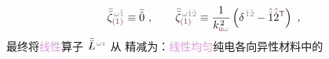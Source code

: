 \begin{align} \label{eq:zeta-restriction-L}
	\bar{\bar{\zeta}}^{\;\! \mathcolor{gray}{\omega} \mathcolor{gray}{\check{1}}}_{\textcolor{Maroon}{(1)}} \equiv \bar{\bar{0}} ~, ~~~~~~ \bar{\bar{\zeta}}^{\;\! \mathcolor{gray}{\omega} \mathcolor{gray}{\check{1} \check{2}}}_{\textcolor{Maroon}{(1)}} \equiv \frac{1}{k_{\textcolor{Maroon}{\mathsf{o}} \mathcolor{gray}{\omega}}^{\;\! 2}} \left( \delta^{\;\! \mathcolor{gray}{\check{1}} \mathcolor{gray}{\check{2}}} - \hat{\mathcolor{gray}{\check{1}}} \hat{\mathcolor{gray}{\check{2}}}^{\mathsf{\textcolor{Plum}{T}}} \right) ~,
\end{align}
最终将\textcolor{Plum}{线性}算子 $\xint{\mathcolor{gray}{-}}{30}{\bar{\bar{L}}}^{\;\! \mathcolor{gray}{\omega} \textcolor{PineGreen}{\imath}}$ 从  精减为：\textcolor{Plum}{线性}\textcolor{Plum}{均匀}\textcolor{PineGreen}{纯电各向异性}材料中的
